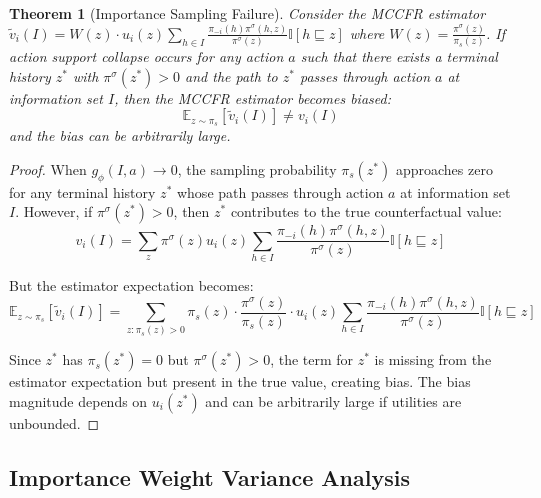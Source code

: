 \documentclass[12pt,a4paper]{article}
\newtheorem{theorem}{Theorem}[section]
\begin{document}
\begin{theorem}[Importance Sampling Failure]
\label{thm:support_collapse}
Consider the MCCFR estimator $\tilde{v}_i(I) = W(z) \cdot u_i(z) \sum_{h \in I} \frac{\pi_{-i}(h) \pi^\sigma(h,z)}{\pi^\sigma(z)} \mathbb{I}[h \sqsubseteq z]$ where $W(z) = \frac{\pi^\sigma(z)}{\pi_s(z)}$. If action support collapse occurs for any action $a$ such that there exists a terminal history $z^*$ with $\pi^\sigma(z^*) > 0$ and the path to $z^*$ passes through action $a$ at information set $I$, then the MCCFR estimator becomes biased:
$$\mathbb{E}_{z \sim \pi_s}[\tilde{v}_i(I)] \neq v_i(I)$$
and the bias can be arbitrarily large.
\end{theorem}

\begin{proof}
When $g_\phi(I, a) \rightarrow 0$, the sampling probability $\pi_s(z^*)$ approaches zero for any terminal history $z^*$ whose path passes through action $a$ at information set $I$. However, if $\pi^\sigma(z^*) > 0$, then $z^*$ contributes to the true counterfactual value:
$$v_i(I) = \sum_{z} \pi^\sigma(z) u_i(z) \sum_{h \in I} \frac{\pi_{-i}(h) \pi^\sigma(h,z)}{\pi^\sigma(z)} \mathbb{I}[h \sqsubseteq z]$$

But the estimator expectation becomes:
$$\mathbb{E}_{z \sim \pi_s}[\tilde{v}_i(I)] = \sum_{z: \pi_s(z) > 0} \pi_s(z) \cdot \frac{\pi^\sigma(z)}{\pi_s(z)} \cdot u_i(z) \sum_{h \in I} \frac{\pi_{-i}(h) \pi^\sigma(h,z)}{\pi^\sigma(z)} \mathbb{I}[h \sqsubseteq z]$$

Since $z^*$ has $\pi_s(z^*) = 0$ but $\pi^\sigma(z^*) > 0$, the term for $z^*$ is missing from the estimator expectation but present in the true value, creating bias. The bias magnitude depends on $u_i(z^*)$ and can be arbitrarily large if utilities are unbounded.
\end{proof}

\subsection{Importance Weight Variance Analysis}
\end{document}
